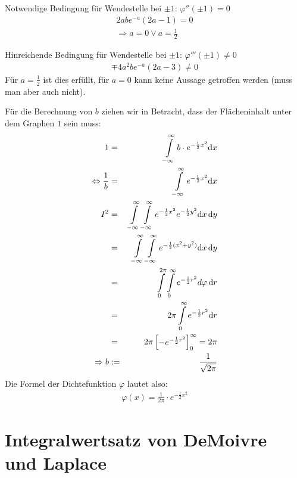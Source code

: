 \documentclass[12pt,a4paper,twocolumn]{article}
\begin{document}
Notwendige Bedingung für Wendestelle bei $\pm 1$: $\varphi''(\pm 1)=0$\\
\begin{eqnarray}
2abe^{-a} (2a-1) = 0 \\
\Rightarrow a = 0 \lor a = \frac{1}{2}
\end{eqnarray}

Hinreichende Bedingung für Wendestelle bei $\pm 1$: $\varphi'''(\pm 1)\neq 0$
\begin{eqnarray}
\mp 4 a^{2} b e^{-a}(2 a -3) \neq 0
\end{eqnarray}
Für $a=\frac{1}{2}$ ist dies erfüllt, für $a=0$ kann keine Aussage getroffen werden (muss man aber auch nicht).

Für die Berechnung von $b$ ziehen wir in Betracht, dass der Flächeninhalt unter dem Graphen $1$ sein muss:
\begin{eqnarray}
1&=&\int\displaylimits^{\infty}_{-\infty} b \cdot e^{-\frac{1}{2}x^2} {\mathrm d}x \\
\Leftrightarrow \frac{1}{b}&=&\int\displaylimits^{\infty}_{-\infty} e^{-\frac{1}{2}x^2} {\mathrm d}x \\
I^2 &=& \int\displaylimits^{\infty}_{-\infty} \int\displaylimits^{\infty}_{-\infty} e^{-\frac{1}{2}x^2} e^{-\frac{1}{2}y^2} {\mathrm d}x \, {\mathrm d}y \\
&=& \int\displaylimits^{\infty}_{-\infty} \int\displaylimits^{\infty}_{-\infty} e^{-\frac{1}{2}(x^2 + y^2)} {\mathrm d}x \, {\mathrm d}y \\ 
&=& \int\displaylimits^{2 \pi}_{0} \int\displaylimits^{\infty}_{0} e^{-\frac{1}{2}r^2} d\varphi \, {\mathrm d}r \\
&=& 2 \pi \int\displaylimits^{\infty}_{0} e^{-\frac{1}{2}r^2} {\mathrm d}r \\
&=& 2 \pi \begin{bmatrix}-e^{-\frac{1}{2} r^2} \end{bmatrix}^\infty_0 = 2 \pi\\
\Rightarrow b&:=&\frac{1}{\sqrt{2\pi}}
\end{eqnarray}
Die Formel der Dichtefunktion $\varphi$ lautet also:
\begin{eqnarray}
 \varphi(x) = \frac{1}{2\pi} \cdot e^{-\frac{1}{2}x^2}
\end{eqnarray}




 \section{Integralwertsatz von DeMoivre und Laplace}
\end{document}

